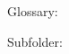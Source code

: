 \documentclass{article}
\begin{document}
Glossary: \ownglossary

Subfolder: \provglossary
\end{document}
